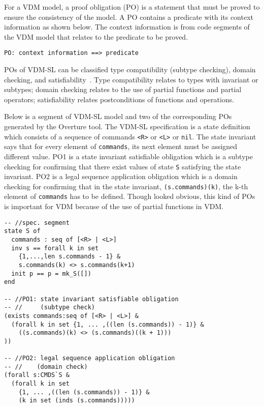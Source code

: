 
For a VDM model, a proof obligation (PO) is a statement that must be proved to ensure the consistency of the model. A PO contains a predicate with its context information as shown below. The context information is from code segments of the VDM model that relates to the predicate to be proved.

\begin{mdframed}[roundcorner=5pt]
\begin{Verbatim}[fontsize=\small]
PO: context information ==> predicate
\end{Verbatim}
\end{mdframed}

POs of VDM-SL can be classified type compatibility (subtype checking), domain checking, and satisfiability~\cite{AL:97:POGV,Vermolen:2010:PCV:1774088.1774608}. Type compatibility relates to types with invariant or subtypes; domain checking relates to the use of partial functions and partial operators; satisfiability relates postconditions of functions and operations. 

Below is a segment of VDM-SL model and two of the corresponding POs generated by the Overture tool. The VDM-SL specification is a state definition which consists of a sequence of commands {\tt <R>} or {\tt <L>} or {\tt nil}. The state invariant says that for every element of {\tt commands}, its next element must be assigned different value. PO1 is a state invariant satisfiable obligation which is a subtype checking for confirming that there exist values of state {\tt S} satisfying the state invariant. PO2 is a legal sequence application obligation which is a domain checking for confirming that in the state invariant, {\tt (s.commands)(k)}, the k-th element of {\tt commands} has to be defined. Though looked obvious, this kind of POs is important for VDM because of the use of partial functions in VDM.

\begin{mdframed}[roundcorner=5pt]
\begin{Verbatim}[fontsize=\small]
-- //spec. segment
state S of
  commands : seq of [<R> | <L>]
  inv s == forall k in set 
    {1,...,len s.commands - 1} &
    s.commands(k) <> s.commands(k+1)
  init p == p = mk_S([])
end

-- //PO1: state invariant satisfiable obligation
-- //     (subtype check)
(exists commands:seq of [<R> | <L>] &
  (forall k in set {1, ... ,((len (s.commands)) - 1)} &
    ((s.commands)(k) <> (s.commands)((k + 1)))
))

-- //PO2: legal sequence application obligation
-- //    (domain check)
(forall s:CMDS`S & 
  (forall k in set 
    {1, ... ,((len (s.commands)) - 1)} & 
    (k in set (inds (s.commands)))))
\end{Verbatim}
\end{mdframed}
